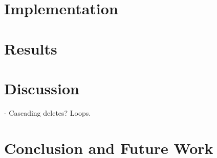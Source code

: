 \documentclass[english,12pt,a4paper]{book}
\begin{document}
\chapter{Implementation}

\chapter{Results}

\chapter{Discussion}

- Cascading deletes? Loops.

\chapter{Conclusion and Future Work}




\appendix
\appendixpage
\addappheadtotoc
\end{document}
